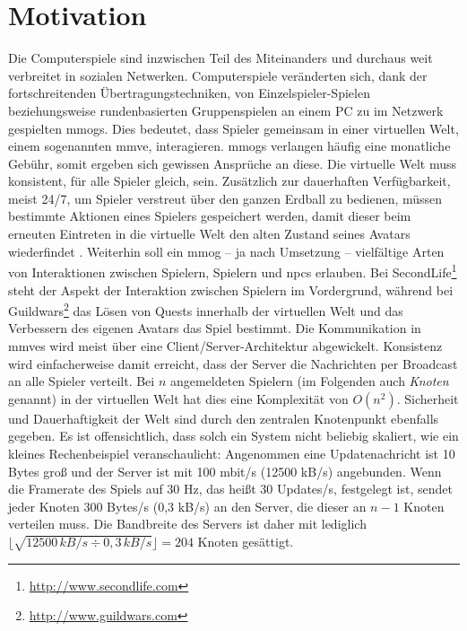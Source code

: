 \chapter{Motivation}
\label{chap:einleitung}
Die Computerspiele sind inzwischen Teil des Miteinanders und durchaus weit verbreitet in sozialen Netwerken. Computerspiele veränderten sich, dank der fortschreitenden Übertragungs\-techniken, von Einzelspieler-Spielen beziehungsweise rundenbasierten Gruppenspielen an einem PC zu im Netzwerk gespielten \acp{mmog}. Dies bedeutet, dass Spieler gemeinsam in einer virtuellen Welt, einem sogenannten \ac{mmve}, interagieren. \acp{mmog} verlangen häufig eine monatliche Gebühr, somit ergeben sich gewissen Ansprüche an diese. Die virtuelle Welt muss konsistent, für alle Spieler gleich, sein. Zusätzlich zur dauerhaften Verfügbarkeit, meist 24/7, um Spieler verstreut über den ganzen Erdball zu bedienen, müssen bestimmte Aktionen eines Spielers gespeichert werden, damit dieser beim erneuten Eintreten in die virtuelle Welt den alten Zustand seines Avatars wiederfindet \cite{Zhang2008Persistence}. Weiterhin soll ein \ac{mmog} -- ja nach Umsetzung -- vielfältige Arten von Interaktionen zwischen Spielern, Spielern und \acp{npc} erlauben. Bei SecondLife\footnote{\url{http://www.secondlife.com}} steht der Aspekt der Interaktion zwischen Spielern im Vordergrund, während bei Guildwars\footnote{\url{http://www.guildwars.com}} das Lösen von Quests innerhalb der virtuellen Welt und das Verbessern des eigenen Avatars das Spiel bestimmt.
Die Kommunikation in \acp{mmve} wird meist über eine Client/Server-Architektur abgewickelt. Konsistenz wird einfacherweise damit erreicht, dass der Server die Nachrichten per Broadcast an alle Spieler verteilt. Bei $n$ angemeldeten Spielern (im Folgenden auch \emph{Knoten} genannt) in der virtuellen Welt hat dies eine Komplexität von $O(n^2)$. Sicherheit und Dauerhaftigkeit der Welt sind durch den zentralen Knotenpunkt ebenfalls gegeben. Es ist offensichtlich, dass solch ein System nicht beliebig skaliert, wie ein kleines Rechenbeispiel veranschaulicht: Angenommen eine Updatenachricht ist 10 Bytes groß und der Server ist mit 100 mbit/s (12500 kB/s) angebunden. Wenn die Framerate des Spiels auf 30 Hz, das heißt 30 Updates/s, festgelegt ist, sendet jeder Knoten 300 Bytes/s (0,3 kB/s) an den Server, die dieser an $n-1$ Knoten verteilen muss. Die Bandbreite des Servers ist daher mit lediglich $\lfloor\sqrt{12500\,kB/s \div 0,3\,kB/s}\rfloor = 204$ Knoten gesättigt.
